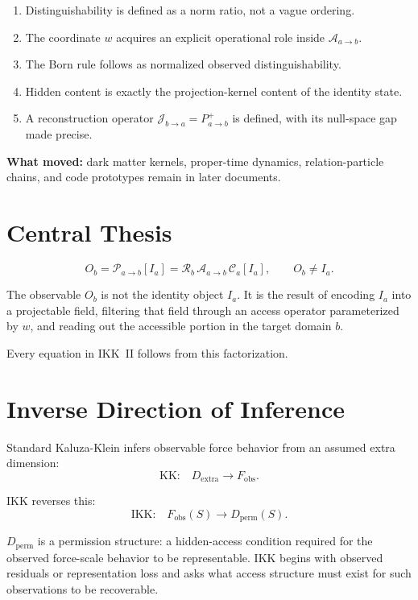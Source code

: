 \documentclass[11pt,a4paper,oneside]{article}
\newcommand{\Ia}{I_a}
\newcommand{\Pab}{\mathcal{P}_{a\to b}}
\newcommand{\Ca}{\mathcal{C}_a}
\newcommand{\Aab}{\mathcal{A}_{a\to b}}
\newcommand{\Rb}{\mathcal{R}_b}
\newcommand{\Ppinv}{P_{a\to b}^{+}}
\newcommand{\Jba}{\mathcal{J}_{b\to a}}
\newcommand{\wcoord}{w}
\begin{document}
\begin{enumerate}
\item Distinguishability is defined as a norm ratio, not a vague ordering.
\item The coordinate $\wcoord$ acquires an explicit operational role inside $\Aab$.
\item The Born rule follows as normalized observed distinguishability.
\item Hidden content is exactly the projection-kernel content of the identity state.
\item A reconstruction operator $\Jba = \Ppinv$ is defined, with its null-space gap made precise.
\end{enumerate}

\textbf{What moved:} dark matter kernels, proper-time dynamics, relation-particle chains, and code prototypes remain in later documents.

\section{Central Thesis}

\[
\boxed{O_b = \Pab[\Ia] = \Rb\,\Aab\,\Ca[\Ia],\qquad O_b \neq \Ia.}
\]

The observable $O_b$ is not the identity object $\Ia$. It is the result of encoding $\Ia$ into a projectable field, filtering that field through an access operator parameterized by $\wcoord$, and reading out the accessible portion in the target domain $b$.

Every equation in IKK~II follows from this factorization.

\section{Inverse Direction of Inference}

Standard Kaluza-Klein infers observable force behavior from an assumed extra dimension:
\[
\text{KK:}\quad D_{\mathrm{extra}} \longrightarrow F_{\mathrm{obs}}.
\]

IKK reverses this:
\[
\boxed{\text{IKK:}\quad F_{\mathrm{obs}}(S) \longrightarrow D_{\mathrm{perm}}(S).}
\]

$D_{\mathrm{perm}}$ is a permission structure: a hidden-access condition required for the observed force-scale behavior to be representable. IKK begins with observed residuals or representation loss and asks what access structure must exist for such observations to be recoverable.
\end{document}

